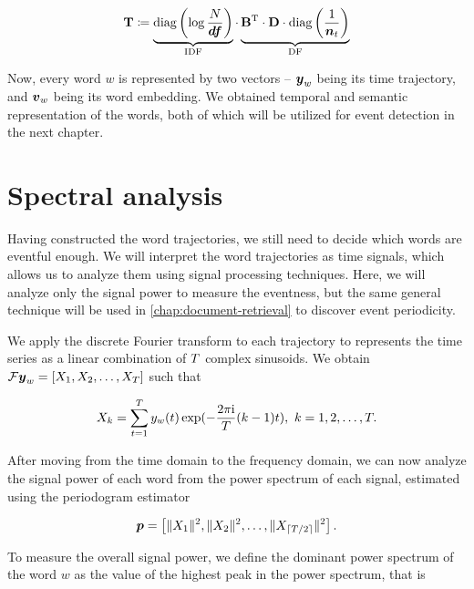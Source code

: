 \begin{equation}
	\trajmat \coloneqq
		\underbrace{\text{diag} \left( \log{\frac{\doccount}{\vect{\df}}} \right)}_{\text{IDF}}
		\cdot
		\underbrace{\bowmat^{\T}
		\cdot \dtdmat
		\cdot \text{diag} \left( \frac{1}{\vect{\doccount}_{t}} \right)}_{\text{DF}}
\end{equation}

Now, every word $w$ is represented by two vectors -- $\vect{\traj}_{w}$ being its time trajectory, and $\embed_{w}$ being its word embedding. We obtained temporal and semantic representation of the words, both of which will be utilized for event detection in the next chapter.


\section{Spectral analysis}
Having constructed the word trajectories, we still need to decide which words are eventful enough. We will interpret the word trajectories as time signals, which allows us to analyze them using signal processing techniques. Here, we will analyze only the signal power to measure the eventness, but the same general technique will be used in \autoref{chap:document-retrieval} to discover event periodicity.

We apply the discrete Fourier transform to each trajectory to represents the time series as a linear combination of $T$ complex sinusoids. We obtain $\mathcal{F} \vect{\traj}_{w} = \left[ X_{1}, X_{2}, \dots, X_{\streamlen}\right ]$ such that

\begin{equation*}
	X_{k} = \sum_{t = 1}^{T}{y_{w}(t) \exp(- \frac{2 \pi \mathrm{i}}{T} (k - 1) t}), ~ k = 1, 2, \dots, T.
\end{equation*}

After moving from the time domain to the frequency domain, we can now analyze the signal power of each word from the power spectrum of each signal, estimated using the periodogram estimator

\begin{equation*}
	\vect{P} = \left[ \|X_{1}\|^{2}, \|X_{2}\|^{2}, \dots, \|X_{\ceil{\streamlen / 2}}\|^{2} \right].
\end{equation*}

To measure the overall signal power, we define the dominant power spectrum of the word $w$ as the value of the highest peak in the power spectrum, that is

